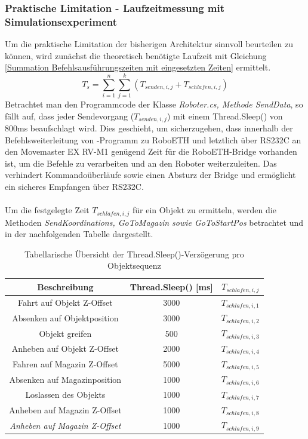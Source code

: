 \subsubsection{Praktische Limitation - Laufzeitmessung mit Simulationsexperiment}
Um die praktische Limitation der bisherigen Architektur sinnvoll beurteilen zu können, wird zunächst die theoretisch benötigte Laufzeit mit Gleichung \ref{Summation Befehlsausführungszeiten mit eingesetzten Zeiten} ermittelt.
\begin{equation*}
	T_{s} = \sum_{i=1}^{n} \sum_{j=1}^{k} (T_{senden, i, j} + T_{schlafen, i, j})
\end{equation*}
Betrachtet man den Programmcode der Klasse \textit{Roboter.cs, Methode SendData}, so fällt auf, dass jeder Sendevorgang ($T_{senden,i,j}$) mit einem Thread.Sleep() von 800ms beaufschlagt wird. Dies geschieht, um sicherzugehen, dass innerhalb der Befehlsweiterleitung von \csharp-Programm zu RoboETH und letztlich über RS232C an den Movemaster EX RV-M1 genügend Zeit für die RoboETH-Bridge vorhanden ist, um die Befehle zu verarbeiten und an den Roboter weiterzuleiten. Das verhindert Kommandoüberläufe sowie einen Absturz der Bridge und ermöglicht ein sicheres Empfangen über RS232C.\\
\\Um die festgelegte Zeit $T_{schlafen,i,j}$ für ein Objekt zu ermitteln, werden die Methoden \textit{SendKoordinations, GoToMagazin sowie GoToStartPos} betrachtet und in der nachfolgenden Tabelle dargestellt.
\begin{table}[h!]
	\centering
	\renewcommand{\arraystretch}{1.2}
	\begin{tabular}{|c|c|c|}
		\hline
		 \textbf{Beschreibung} & \textbf{Thread.Sleep() [ms]} & $T_{schlafen,i,j}$ \\ \hline
		Fahrt auf Objekt Z-Offset  & 3000 & $T_{schlafen,i,1}$ \\ \hline
		Absenken auf Objektposition & 3000 & $T_{schlafen,i,2}$ \\ \hline
		Objekt greifen & 500 & $T_{schlafen,i,3}$ \\ \hline
		Anheben auf Objekt Z-Offset & 2000 & $T_{schlafen,i,4}$ \\ \hline
		Fahren auf Magazin Z-Offset & 5000 & $T_{schlafen,i,5}$ \\ \hline
		Absenken auf Magazinposition & 1000 & $T_{schlafen,i,6}$\\ \hline
		Loslassen des Objekts & 1000 & $T_{schlafen,i,7}$ \\ \hline
		Anheben auf Magazin Z-Offset & 1000 & $T_{schlafen,i,8}$ \\ \hline
		\textit{Anheben auf Magazin Z-Offset} & 1000 & $T_{schlafen,i,9}$ \\ \hline
	\end{tabular}
	\caption{Tabellarische Übersicht der Thread.Sleep()-Verzögerung pro Objektsequenz}
	\label{tab:thread.sleep()-zeiten}
\end{table} 
